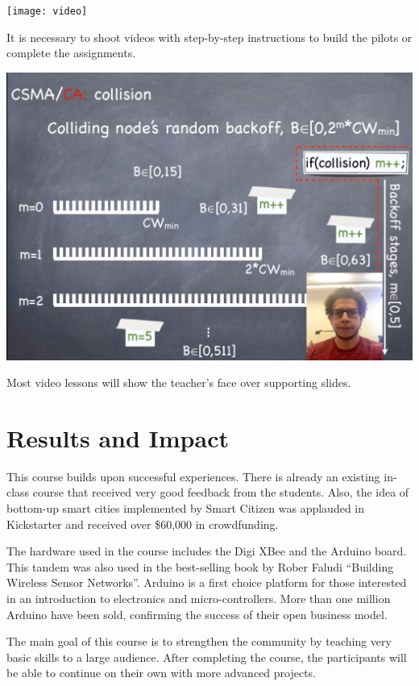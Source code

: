 \documentclass{tufte-book} %
\begin{document}
\begin{marginfigure}
\texttt{[image: video]}
\caption{It is necessary to shoot videos with step-by-step instructions to build the pilots or complete the assignments.}
\label{fig:video}
\end{marginfigure}
\begin{marginfigure}
\includegraphics[width=\linewidth]{lesson}
\caption{Most video lessons will show the teacher's face over supporting slides.}
\label{fig:lesson}
\end{marginfigure}


\chapter{Results and Impact}

This course builds upon successful experiences. There is already an existing in-class course that received very good feedback from the students. Also, the idea of bottom-up smart cities implemented by Smart Citizen was applauded in Kickstarter and received over \$60,000 in crowdfunding. 

The hardware used in the course includes the Digi XBee and the Arduino board. 
This tandem was also used in the best-selling book by Rober Faludi ``Building Wireless Sensor Networks''.
Arduino is a first choice platform for those interested in an introduction to electronics and micro-controllers.
More than one million Arduino have been sold, confirming the success of their open business model.

The main goal of this course is to strengthen the community by teaching very basic skills to a large audience. After completing the course, the participants will be able to continue on their own with more advanced projects. 
\end{document}
